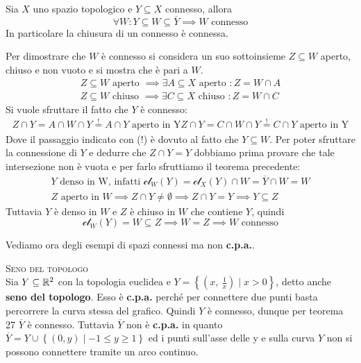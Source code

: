 \begin{theorema}
	Sia $X$ uno spazio topologico e $Y\subseteq X$ connesso, allora 
		\begin{equation*}
			\forall W \colon Y\subseteq W \subseteq \overline{Y} \implies W \text{ connesso}
		\end{equation*}
	In particolare la chiusura di un connesso è connessa.
\end{theorema}
\begin{demonstration}
	Per dimostrare che $W$ è connesso si considera un suo sottoinsieme $Z\subseteq W$ aperto, chiuso e non vuoto e si mostra che è pari a $W$.
		\begin{gather*}
			Z\subseteq W \text{ aperto } \implies \exists A\subseteq X \text{ aperto } \colon Z=W\cap A \\
			Z\subseteq W \text{ chiuso } \implies \exists C\subseteq X \text{ chiuso } \colon Z=W\cap C
		\end{gather*}
	Si vuole sfruttare il fatto che $Y$ è connesso:
		\begin{gather*}
			Z\cap Y=A\cap W\cap Y \stackrel{!}{=} A\cap Y \text{ aperto in Y}
			Z\cap Y=C\cap W\cap Y \stackrel{!}{=} C\cap Y \text{ aperto in Y}			
		\end{gather*}
	Dove il passaggio indicato con (!) è dovuto al fatto che $Y\subseteq W$. Per poter sfruttare la connessione di $Y$ e dedurre che $Z\cap Y=Y$ dobbiamo prima provare che tale intersezione non è vuota e per farlo sfruttiamo il teorema precedente:
		\begin{gather*}
			Y \text{ denso in W, infatti  } \mathcal{cl}_W(Y)=\mathcal{cl}_X(Y)\cap W=\overline{Y}\cap W=W\\
			Z \text{ aperto in } W \implies Z\cap Y \neq \emptyset \implies Z\cap Y=Y \implies Y\subseteq Z
		\end{gather*}
	Tuttavia $Y$ è denso in $W$ e $Z$ è chiuso in $W$ che contiene $Y$, quindi 
		\begin{equation*}
			\mathcal{cl}_W(Y)=W\subseteq Z \implies W=Z \implies W \text{ connesso}
		\end{equation*}
\end{demonstration}
Vediamo ora degli esempi di spazi connessi ma non \textbf{c.p.a.}.
\begin{example}\textsc{Seno del topologo}\\
	Sia $Y\subseteq \mathbb{R}^2$ con la topologia euclidea e $Y=\left\{ \left( x,\ \frac{1}{x} \right) \mid x>0 \right\}$, detto anche \textbf{seno del topologo}. Esso è \textbf{c.p.a.} perché per connettere due punti basta percorrere la curva stessa del grafico. Quindi $Y$ è connesso, dunque per teorema 27 $\overline{Y}$ è connesso. 
	Tuttavia $\overline{Y}$ non è \textbf{c.p.a.} in quanto $\overline{Y}=Y\cup \left\{ (0,y) \mid -1\leq y \geq 1 \right\}$ ed i punti sull'asse delle y  e sulla curva $Y$ non si possono connettere tramite un arco continuo.
\end{example}

